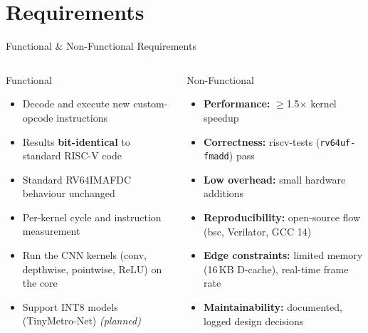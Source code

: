 \documentclass[aspectratio=169,11pt]{beamer}
\begin{document}
\section{Requirements}
\begin{frame}{Functional \& Non-Functional Requirements}
  \begin{columns}[T]
    \begin{block}{Functional}
      \begin{itemize}\small
        \item Decode and execute new custom-opcode instructions
        \item Results \textbf{bit-identical} to standard RISC-V code
        \item Standard RV64IMAFDC behaviour unchanged
        \item Per-kernel cycle and instruction measurement
        \item Run the CNN kernels (conv, depthwise, pointwise, ReLU) on the core
        \item Support INT8 models (TinyMetro-Net) \emph{(planned)}
      \end{itemize}
    \end{block}
    \begin{block}{Non-Functional}
      \begin{itemize}\small
        \item \textbf{Performance:} $\geq$1.5$\times$ kernel speedup
        \item \textbf{Correctness:} riscv-tests (\texttt{rv64uf-fmadd}) pass
        \item \textbf{Low overhead:} small hardware additions
        \item \textbf{Reproducibility:} open-source flow
              (bsc, Verilator, GCC 14)
        \item \textbf{Edge constraints:} limited memory
              (16\,KB D-cache), real-time frame rate
        \item \textbf{Maintainability:} documented, logged design decisions
      \end{itemize}
    \end{block}
  \end{columns}
\end{frame}

\end{document}
